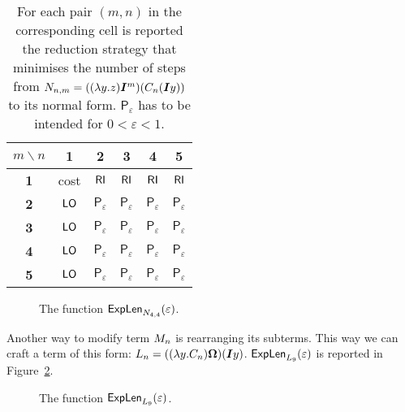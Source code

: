 \begin{table}
	\centering
\begin{tabular}{|c|c|c|c|c|c|}
	\hline 
	$m\backslash n$ & \textbf{1} & \textbf{2} & \textbf{3} & \textbf{4} & \textbf{5}\tabularnewline
	\hline 
	\textbf{1} &cost  &$\textsf{RI}$  &$\textsf{RI}$  &$\textsf{RI}$  &$\textsf{RI}$ \tabularnewline
	\hline 
	\textbf{2} &$\textsf{LO}$  &$\mathsf{P}_\varepsilon$  &$\mathsf{P}_\varepsilon$  &$\mathsf{P}_\varepsilon$  &$\mathsf{P}_\varepsilon$ \tabularnewline
	\hline 
	\textbf{3} &$\textsf{LO}$  &$\mathsf{P}_\varepsilon$  &$\mathsf{P}_\varepsilon$  &$\mathsf{P}_\varepsilon$  &$\mathsf{P}_\varepsilon$ \tabularnewline
	\hline 
	\textbf{4} &$\textsf{LO}$  &$\mathsf{P}_\varepsilon$  &$\mathsf{P}_\varepsilon$  &$\mathsf{P}_\varepsilon$  &$\mathsf{P}_\varepsilon$ \tabularnewline
	\hline 
	\textbf{5} &$\textsf{LO}$  &$\mathsf{P}_\varepsilon$  &$\mathsf{P}_\varepsilon$  &$\mathsf{P}_\varepsilon$  &$\mathsf{P}_\varepsilon$ \tabularnewline
	\hline 
\end{tabular}
\caption[Optimal strategies for $\termtwo_{n,m}=((\lambda y.z)\bm{I}^m) (C_n(\bm{I}y))$]{For each pair $(m,n)$ in the corresponding cell is reported the reduction strategy that minimises the number of steps from $\termtwo_{n,m}=((\lambda y.z)\bm{I}^m) (C_n(\bm{I}y))$ to its normal form. $\mathsf{P}_\varepsilon$ has to be intended for $0<\varepsilon<1$.}
\label{table:optimal}
\end{table}
\begin{figure}
		\caption{The function $\textsf{ExpLen}_{N_{4,4}}(\varepsilon)$.}
		\label{figure:strnor}
	\end{figure}
Another way to modify term $M_n$ is rearranging its subterms. This way we can craft a term of this form: $L_n=((\lambda y.C_n)\bm{\Omega})(\bm{I}y)$. $\textsf{ExpLen}_{L_9}(\varepsilon)$ is reported in Figure~\ref{figure:plot2}.
\begin{figure}
		\caption{The function $\textsf{ExpLen}_{L_9}(\varepsilon)$.}
		\label{figure:plot2}
	\end{figure}
